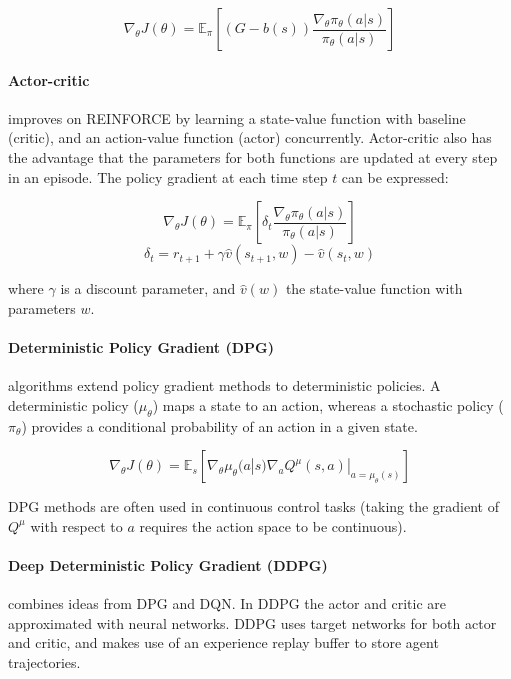 \documentclass[11pt,a4paper]{article}
\begin{document}
\begin{equation}
  \nabla_\theta J(\theta)=\mathbb{E}_\pi\left[(G-b(s)) \frac{\nabla_\theta\pi_\theta(a|s)}{\pi_\theta(a|s)}\right]
\end{equation}

\paragraph{Actor-critic} \citep{bhatnagar2009natural} improves on REINFORCE by learning a state-value function with baseline (critic), and an action-value function (actor) concurrently.
Actor-critic also has the advantage that the parameters for both functions are updated at every step in an episode.
The policy gradient at each time step $t$ can be expressed:

\begin{equation}
  \nabla_\theta J(\theta)=\mathbb{E}_\pi\left[\delta_t \frac{\nabla_\theta\pi_\theta(a|s)}{\pi_\theta(a|s)}\right]
\end{equation}
\begin{equation}
  \delta_t = r_{t+1}+\gamma \hat{v}(s_{t+1}, w)-\hat{v}(s_t,w)
\end{equation}

where $\gamma$ is a discount parameter, and $\hat{v}(w)$ the state-value function with parameters $w$.

\paragraph{Deterministic Policy Gradient (DPG)} \citep{pmlr-v32-silver14} algorithms extend policy gradient methods to deterministic policies.
A deterministic policy ($\mu_\theta$) maps a state to an action,
whereas a stochastic policy ($\pi_\theta$) provides a conditional probability of an action in a given state.

\begin{equation}
  \nabla_\theta J(\theta)=\mathbb{E}_s\left[\nabla_\theta \mu_\theta(a|s) \nabla_a Q^\mu(s,a)|_{a=\mu_\theta(s)}\right]
\end{equation}

DPG methods are often used in continuous control tasks
(taking the gradient of $Q^\mu$ with respect to $a$ requires the action space to be continuous).

\paragraph{Deep Deterministic Policy Gradient (DDPG)} \citep{lillicrap2019continuous} combines ideas from DPG and DQN.
In DDPG the actor and critic are approximated with neural networks.
DDPG uses target networks for both actor and critic, and makes use of an experience replay buffer to store agent trajectories.
\end{document}
